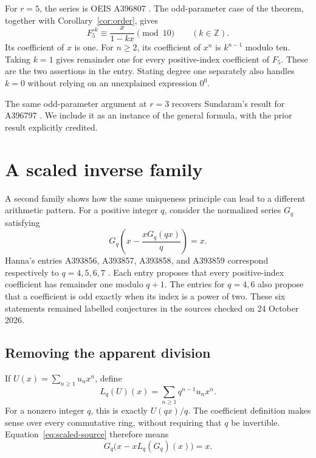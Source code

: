 \documentclass[11pt,a4paper]{article}
\theoremstyle{remark}
\newcommand{\Z}{\mathbb Z}
\begin{document}
For $r=5$, the series is OEIS A396807 \cite{oeis807}. The odd-parameter
case of the theorem, together with Corollary~\ref{cor:order}, gives
\[
F_5^{\circ k}\equiv\frac{x}{1-kx}\pmod{10}\qquad(k\in\Z).
\]
Its coefficient of $x$ is one. For $n\ge2$, its coefficient of
$x^n$ is $k^{n-1}$ modulo ten. Taking $k=1$ gives remainder one
for every positive-index coefficient of $F_5$. These are the two
assertions in the entry. Stating degree one separately also handles
$k=0$ without relying on an unexplained expression $0^0$.

The same odd-parameter argument at $r=3$ recovers Sundaram's result
for A396797 \cite{oeis797,sundaram}. We include it as an instance
of the general formula, with the prior result explicitly credited.

\section{A scaled inverse family}\label{sec:scaled}

A second family shows how the same uniqueness principle can lead to
a different arithmetic pattern. For a positive integer $q$, consider
the normalized series $G_q$ satisfying
\begin{equation}\label{eq:scaled-source}
G_q\left(x-\frac{xG_q(qx)}q\right)=x.
\end{equation}
Hanna's entries A393856, A393857, A393858, and A393859 correspond
respectively to $q=4,5,6,7$
\cite{oeis856,oeis857,oeis858,oeis859}. Each entry proposes that
every positive-index coefficient has remainder one modulo $q+1$.
The entries for $q=4,6$ also propose that a coefficient is odd
exactly when its index is a power of two. These six statements
remained labelled conjectures in the sources checked on
24 October 2026.

\subsection{Removing the apparent division}

If $U(x)=\sum_{n\ge1}u_nx^n$, define
\[
L_q(U)(x)=\sum_{n\ge1}q^{n-1}u_nx^n.
\]
For a nonzero integer $q$, this is exactly $U(qx)/q$. The coefficient
definition makes sense over every commutative ring, without requiring
that $q$ be invertible. Equation~\eqref{eq:scaled-source} therefore
means
\begin{equation}\label{eq:scaled-nodiv}
G_q\bigl(x-xL_q(G_q)(x)\bigr)=x.
\end{equation}
\end{document}
